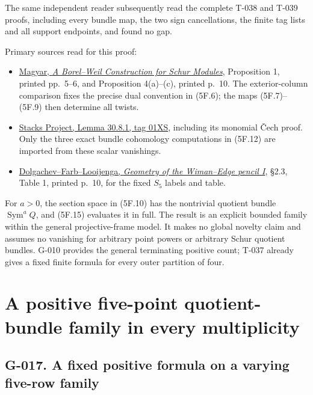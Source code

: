 \documentclass[
  10pt,
]{article}
\providecommand{\tightlist}{%
  \setlength{\itemsep}{0pt}\setlength{\parskip}{0pt}}
\providecommand{\tightlist}{\setlength{\itemsep}{0pt}\setlength{\parskip}{0pt}}
\begin{document}
The same independent reader subsequently read the complete T-038 and
T-039 proofs, including every bundle map, the two sign cancellations,
the finite tag lists and all support endpoints, and found no gap.

Primary sources read for this proof:

\begin{itemize}
\tightlist
\item
  \href{https://arxiv.org/pdf/alg-geom/9411014}{Magyar, \emph{A
  Borel--Weil Construction for Schur Modules}}, Proposition 1, printed
  pp.~5--6, and Proposition 4(a)--(c), printed p.~10. The
  exterior-column comparison fixes the precise dual convention in
  (5F.6); the maps (5F.7)--(5F.9) then determine all twists.
\item
  \href{https://stacks.math.columbia.edu/tag/01XS}{Stacks Project, Lemma
  30.8.1, tag 01XS}, including its monomial Čech proof. Only the three
  exact bundle cohomology computations in (5F.12) are imported from
  these scalar vanishings.
\item
  \href{https://www.math.uchicago.edu/~farb/papers/wiman.pdf}{Dolgachev--Farb--Looijenga,
  \emph{Geometry of the Wiman--Edge pencil I}}, §2.3, Table 1, printed
  p.~10, for the fixed \(S_5\) labels and table.
\end{itemize}

For \(a>0\), the section space in (5F.10) has the nontrivial quotient
bundle \(\operatorname{Sym}^aQ\), and (5F.15) evaluates it in full. The
result is an explicit bounded family within the general projective-frame
model. It makes no global novelty claim and assumes no vanishing for
arbitrary point powers or arbitrary Schur quotient bundles. G-010
provides the general terminating positive count; T-037 already gives a
fixed finite formula for every outer partition of four.

\section{A positive five-point quotient-bundle family in every
multiplicity}\label{a-positive-five-point-quotient-bundle-family-in-every-multiplicity}

\subsection{G-017. A fixed positive formula on a varying five-row
family}\label{g-017.-a-fixed-positive-formula-on-a-varying-five-row-family}
\end{document}
